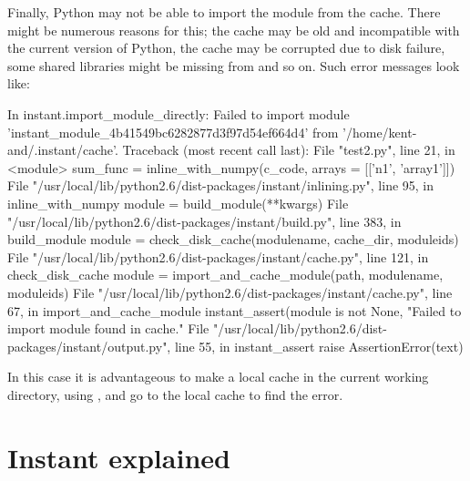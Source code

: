 Finally, Python may not be able to import the module from the
cache. There might be numerous reasons for this; the cache may be old
and incompatible with the current version of Python, the cache may be
corrupted due to disk failure, some shared libraries might be missing
from  and so on.  Such error messages look
like:
\begin{progoutput}
In instant.import_module_directly:
Failed to import module 'instant_module_4b41549bc6282877d3f97d54ef664d4' from '/home/kent-and/.instant/cache'.
Traceback (most recent call last):
  File "test2.py", line 21, in <module>
    sum_func = inline_with_numpy(c_code, arrays = [['n1', 'array1']])
  File "/usr/local/lib/python2.6/dist-packages/instant/inlining.py", line 95, in inline_with_numpy
    module = build_module(**kwargs)
  File "/usr/local/lib/python2.6/dist-packages/instant/build.py", line 383, in build_module
    module = check_disk_cache(modulename, cache_dir, moduleids)
  File "/usr/local/lib/python2.6/dist-packages/instant/cache.py", line 121, in check_disk_cache
    module = import_and_cache_module(path, modulename, moduleids)
  File "/usr/local/lib/python2.6/dist-packages/instant/cache.py", line 67, in import_and_cache_module
    instant_assert(module is not None, "Failed to import module found in cache."
  File "/usr/local/lib/python2.6/dist-packages/instant/output.py", line 55, in instant_assert
    raise AssertionError(text)
\end{progoutput}
In this case it is advantageous to make a local cache in the current working directory, using , and go
to the local cache to find the error.

\section{Instant explained}
\label{wilbers:sec:explained}

